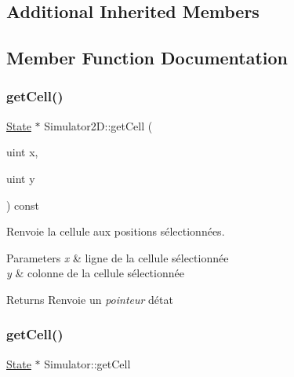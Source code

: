 \subsection*{Additional Inherited Members}


\subsection{Member Function Documentation}
\mbox{\label{class_simulator2_d_ad62d4ce6ea01879a9ff84718e5bdc092}} 
\subsubsection{\texorpdfstring{get\+Cell()}{getCell()}\hspace{0.1cm}{\footnotesize\ttfamily [1/2]}}
{\footnotesize\ttfamily \mbox{\hyperlink{class_state}{State}} $\ast$ Simulator2\+D\+::get\+Cell (\begin{DoxyParamCaption}\item[{uint}]{x,  }\item[{uint}]{y }\end{DoxyParamCaption}) const}



Renvoie la cellule aux positions sélectionnées. 


\begin{DoxyParams}{Parameters}
{\em x} & ligne de la cellule sélectionnée \\
\hline
{\em y} & colonne de la cellule sélectionnée \\
\hline
\end{DoxyParams}
\begin{DoxyReturn}{Returns}
Renvoie un {\itshape pointeur} d\textquotesingle{}état 
\end{DoxyReturn}
\mbox{\label{class_simulator2_d_ae70ae4a330ecf02f4a9a19117c2f72ec}} 
\subsubsection{\texorpdfstring{get\+Cell()}{getCell()}\hspace{0.1cm}{\footnotesize\ttfamily [2/2]}}
{\footnotesize\ttfamily \mbox{\hyperlink{class_state}{State}} $\ast$ Simulator\+::get\+Cell}



